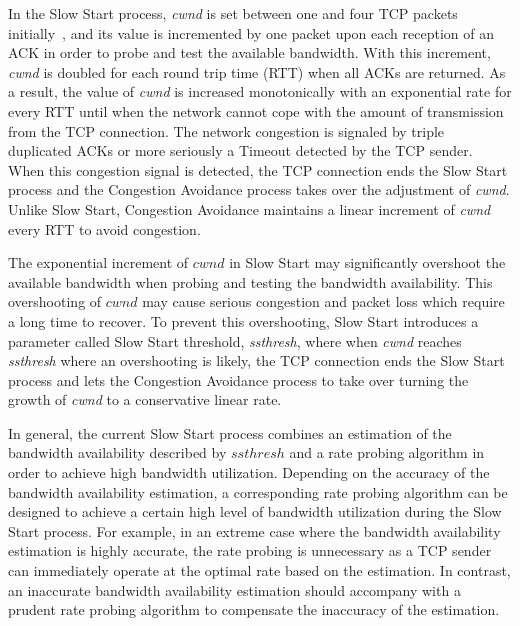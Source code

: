 \documentclass[12pt,onecolumn]{IEEEtran}
\begin{document}
In the Slow Start process, \emph{cwnd} is set between one and four TCP packets
initially~\cite{initial1}, and its value is incremented by one packet upon each
reception of an ACK in order to probe and test the available bandwidth. With
this increment, \emph{cwnd} is doubled for each round trip time (RTT) when all
ACKs are returned. As a result, the value of \emph{cwnd} is increased
monotonically with an exponential rate for every RTT until when the network
cannot cope with the amount of transmission from the TCP connection. The
network congestion is signaled by triple duplicated ACKs or more seriously a
Timeout detected by the TCP sender. When this congestion signal is detected,
the TCP connection ends the Slow Start process and the Congestion Avoidance
process takes over the adjustment of \emph{cwnd}. Unlike Slow Start, Congestion
Avoidance maintains a linear increment of \emph{cwnd} every RTT to avoid
congestion.

The exponential increment of $cwnd$ in Slow Start may significantly overshoot
the available bandwidth when probing and testing the bandwidth availability.
This overshooting of $cwnd$ may cause serious congestion and packet loss which
require a long time to recover. To prevent this overshooting, Slow Start
introduces a parameter called Slow Start threshold, \emph{ssthresh}, where when
\emph{cwnd} reaches \emph{ssthresh} where an overshooting is likely, the TCP
connection ends the Slow Start process and lets the Congestion Avoidance
process to take over turning the growth of \emph{cwnd} to a conservative linear
rate.

In general, the current Slow Start process combines an estimation of the
bandwidth availability described by $ssthresh$ and a rate probing algorithm in
order to achieve high bandwidth utilization. Depending on the accuracy of the
bandwidth availability estimation, a corresponding rate probing algorithm can
be designed to achieve a certain high level of bandwidth utilization during the
Slow Start process. For example, in an extreme case where the bandwidth
availability estimation is highly accurate, the rate probing is unnecessary as
a TCP sender can immediately operate at the optimal rate based on the
estimation. In contrast, an inaccurate bandwidth availability estimation should
accompany with a prudent rate probing algorithm to compensate the inaccuracy of
the estimation.
\end{document}
